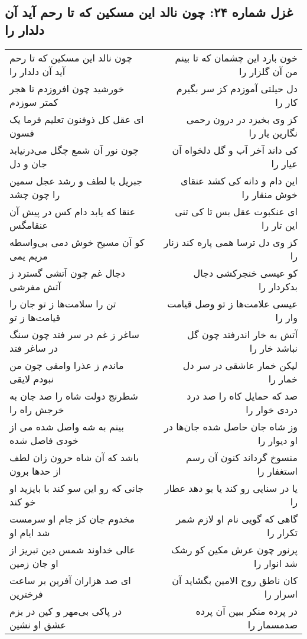 \begin{center}
\section*{غزل شماره ۲۴: چون نالد این مسکین که تا رحم آید آن دلدار را}
\label{sec:0024}
\begin{longtable}{l p{0.5cm} r}
چون نالد این مسکین که تا رحم آید آن دلدار را
&&
خون بارد این چشمان که تا بینم من آن گلزار را
\\
خورشید چون افروزدم تا هجر کمتر سوزدم
&&
دل حیلتی آموزدم کز سر بگیرم کار را
\\
ای عقل کل ذوفنون تعلیم فرما یک فسون
&&
کز وی بخیزد در درون رحمی نگارین یار را
\\
چون نور آن شمع چگل می‌درنیابد جان و دل
&&
کی داند آخر آب و گل دلخواه آن عیار را
\\
جبریل با لطف و رشد عجل سمین را چون چشد
&&
این دام و دانه کی کشد عنقای خوش منقار را
\\
عنقا که یابد دام کس در پیش آن عنقامگس
&&
ای عنکبوت عقل بس تا کی تنی این تار را
\\
کو آن مسیح خوش دمی بی‌واسطه مریم یمی
&&
کز وی دل ترسا همی پاره کند زنار را
\\
دجال غم چون آتشی گسترد ز آتش مفرشی
&&
کو عیسی خنجرکشی دجال بدکردار را
\\
تن را سلامت‌ها ز تو جان را قیامت‌ها ز تو
&&
عیسی علامت‌ها ز تو وصل قیامت وار را
\\
ساغر ز غم در سر فتد چون سنگ در ساغر فتد
&&
آتش به خار اندرفتد چون گل نباشد خار را
\\
ماندم ز عذرا وامقی چون من نبودم لایقی
&&
لیکن خمار عاشقی در سر دل خمار را
\\
شطرنج دولت شاه را صد جان به خرجش راه را
&&
صد که حمایل کاه را صد درد دردی خوار را
\\
بینم به شه واصل شده می از خودی فاصل شده
&&
وز شاه جان حاصل شده جان‌ها در او دیوار را
\\
باشد که آن شاه حرون زان لطف از حدها برون
&&
منسوخ گرداند کنون آن رسم استغفار را
\\
جانی که رو این سو کند با بایزید او خو کند
&&
یا در سنایی رو کند یا بو دهد عطار را
\\
مخدوم جان کز جام او سرمست شد ایام او
&&
گاهی که گویی نام او لازم شمر تکرار را
\\
عالی خداوند شمس دین تبریز از او جان زمین
&&
پرنور چون عرش مکین کو رشک شد انوار را
\\
ای صد هزاران آفرین بر ساعت فرخترین
&&
کان ناطق روح الامین بگشاید آن اسرار را
\\
در پاکی بی‌مهر و کین در بزم عشق او نشین
&&
در پرده منکر ببین آن پرده صدمسمار را
\\
\end{longtable}
\end{center}
